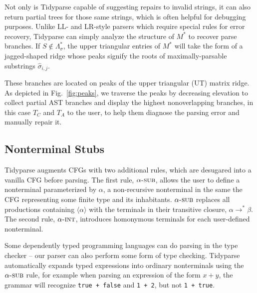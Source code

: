 \documentclass[sigplan,review,anonymous,acmsmall]{acmart}\settopmatter{printfolios=false,printccs=false,printacmref=false}
\begin{document}
Not only is Tidyparse capable of suggesting repairs to invalid strings, it can also return partial trees for those same strings, which is often helpful for debugging purposes. Unlike LL- and LR-style parsers which require special rules for error recovery, Tidyparse can simply analyze the structure of $M^*$ to recover parse branches. If $S \notin  \Lambda^*_\sigma$, the upper triangular entries of $M^*$ will take the form of a jagged-shaped ridge whose peaks signify the roots of maximally-parsable substrings $\hat{\sigma}_{i, j}$.

These branches are located on peaks of the upper triangular (UT) matrix ridge. As depicted in Fig.~\ref{fig:peaks}, we traverse the peaks by decreasing elevation to collect partial AST branches and display the highest nonoverlapping branches, in this case $T_C$ and $T_A$ to the user, to help them diagnose the parsing error and manually repair it.

\subsection{Nonterminal Stubs}

Tidyparse augments CFGs with two additional rules, which are desugared into a vanilla CFG before parsing. The first rule, $\alpha\textsc{-sub}$, allows the user to define a nonterminal parameterized by $\alpha$, a non-recursive nonterminal in the same the CFG representing some finite type and its inhabitants. $\alpha\textsc{-sub}$ replaces all productions containing $\langle\alpha\rangle$ with the terminals in their transitive closure, $\alpha \rightarrow^* \beta$. The second rule, $\alpha\textsc{-int}$, introduces homonymous terminals for each user-defined nonterminal.

\begin{figure}[H]
\end{figure}

\noindent Some dependently typed programming languages can do parsing in the type checker -- our parser can also perform some form of type checking. Tidyparse automatically expands typed expressions into ordinary nonterminals using the $\alpha\textsc{-sub}$ rule, for example when parsing an expression of the form $x + y$, the grammar will recognize \texttt{true + false} and \texttt{1 + 2}, but not \texttt{1 + true}.
\end{document}
